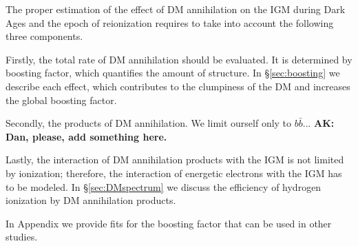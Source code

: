 The proper estimation of the effect of DM annihilation on the IGM during Dark Ages and the epoch of reionization requires to take into account the following three components.

Firstly, the total rate of DM annihilation should be evaluated. It is determined by boosting factor, which quantifies the amount of structure. In \S\ref{sec:boosting} we describe each effect, which contributes to the clumpiness of the DM and increases the global boosting factor.

Secondly, the products of DM annihilation. We limit ourself only to $b\bar{b}$...
\textbf{AK: Dan, please, add something here.}

Lastly, the interaction of DM annihilation products with the IGM is not limited by ionization; therefore, the interaction of energetic electrons with the IGM has to be modeled. In \S\ref{sec:DMspectrum} we discuss the efficiency of hydrogen ionization by DM annihilation products.

In Appendix we provide fits for the boosting factor that can be used in other studies.